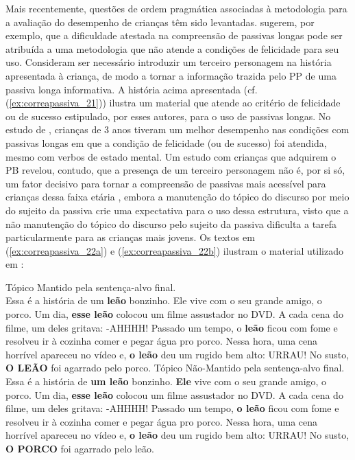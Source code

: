 \documentclass[output=paper]{LSP/langsci}
\begin{document}
Mais recentemente, questões de ordem pragmática associadas à metodologia para a avaliação do desempenho de crianças têm sido levantadas. \citet{obrien_etal2006} sugerem, por exemplo, que a dificuldade atestada na compreensão de passivas longas pode ser atribuída a uma metodologia que não atende a condições de felicidade para seu uso. Consideram ser necessário introduzir um terceiro personagem na história apresentada à criança, de modo a tornar a informação trazida pelo PP de uma passiva longa informativa. A história acima apresentada (cf. (\ref{ex:correapassiva_21})) ilustra um material que atende ao critério de felicidade ou de sucesso estipulado, por esses autores, para o uso de passivas longas. No estudo de \citeauthor{obrien_etal2006}, crianças de 3 anos tiveram um melhor desempenho nas condições com passivas longas em que a condição de felicidade (ou de sucesso) foi atendida, mesmo com verbos de estado mental. Um estudo com crianças que adquirem o PB revelou, contudo, que a presença de um terceiro personagem não é, por si só, um fator decisivo para tornar a compreensão de passivas mais acessível para crianças dessa faixa etária \citep{limajunior2016}, embora a manutenção do tópico do discurso por meio do sujeito da passiva crie uma expectativa para o uso dessa estrutura, visto que a não manutenção do tópico do discurso pelo sujeito da passiva dificulta a tarefa particularmente para as crianças mais jovens\citep{limajunior2016}. 
Os textos em (\ref{ex:correapassiva_22a}) e (\ref{ex:correapassiva_22b}) ilustram o material utilizado em \citet{limajunior2016}: 

\noindent\parbox{\textwidth}{\ea\label{ex:correapassiva_22}
\ea\label{ex:correapassiva_22a}
Tópico Mantido pela sentença-alvo final.\\
Essa é a história de um \textbf{leão} bonzinho. Ele vive com o seu grande amigo, o porco. Um dia, \textbf{esse leão} colocou um filme assustador no DVD. A cada cena do filme, um deles gritava: -AHHHH! Passado um tempo, o \textbf{leão} ficou com fome e resolveu ir à cozinha comer e pegar água pro porco. Nessa hora, uma cena horrível apareceu no vídeo e, \textbf{o leão} deu um rugido bem alto: URRAU! No susto, \textbf{O LEÃO} foi agarrado pelo porco.
\ex\label{ex:correapassiva_22b}
Tópico Não-Mantido pela sentença-alvo final.\\
Essa é a história de \textbf{um leão} bonzinho. \textbf{Ele} vive com o seu grande amigo, o porco. Um dia, \textbf{esse leão} colocou um filme assustador no DVD. A cada cena do filme, um deles gritava: -AHHHH! Passado um tempo, \textbf{o leão} ficou com fome e resolveu ir à cozinha comer e pegar água pro porco. Nessa hora, uma cena horrível apareceu no vídeo e, \textbf{o leão} deu um rugido bem alto: URRAU! No susto, \textbf{O PORCO} foi agarrado pelo leão.
\zl}
\end{document}

